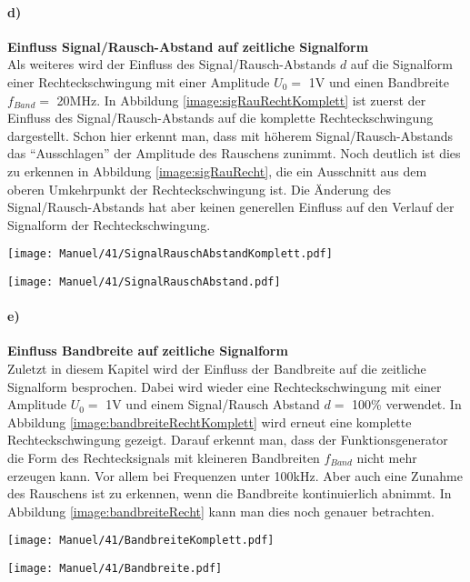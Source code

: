 \paragraph{d)}\textbf{Einfluss Signal/Rausch-Abstand auf zeitliche Signalform}\\
Als weiteres wird der Einfluss des Signal/Rausch-Abstands $d$ auf die Signalform einer Rechteckschwingung mit einer Amplitude $U_0=$ 1V und einen Bandbreite $f_{Band}=$ 20MHz.
In Abbildung \ref{image:sigRauRechtKomplett} ist zuerst der Einfluss des Signal/Rausch-Abstands auf die komplette Rechteckschwingung dargestellt. Schon hier erkennt man, dass mit höherem Signal/Rausch-Abstands das \enquote{Ausschlagen} der Amplitude des Rauschens zunimmt. Noch deutlich ist dies zu erkennen in Abbildung \ref{image:sigRauRecht}, die ein Ausschnitt aus dem oberen Umkehrpunkt der Rechteckschwingung ist. Die Änderung des Signal/Rausch-Abstands hat aber keinen generellen Einfluss auf den Verlauf der Signalform der Rechteckschwingung.
\newpage
\begin{center}
    \texttt{[image: Manuel/41/SignalRauschAbstandKomplett.pdf]}
    \label{image:sigRauRechtKomplett}
\end{center}
\begin{center}
    \texttt{[image: Manuel/41/SignalRauschAbstand.pdf]}
    \label{image:sigRauRecht}
\end{center}

\paragraph{e)}\textbf{Einfluss Bandbreite auf zeitliche Signalform}\\
Zuletzt in diesem Kapitel wird der Einfluss der Bandbreite auf die zeitliche Signalform besprochen. Dabei wird wieder eine Rechteckschwingung mit einer Amplitude $U_0=$ 1V und einem Signal/Rausch Abstand $d=$ 100\% verwendet. In Abbildung \ref{image:bandbreiteRechtKomplett} wird erneut eine komplette Rechteckschwingung gezeigt. Darauf erkennt man, dass der Funktionsgenerator die Form des Rechtecksignals mit kleineren Bandbreiten $f_{Band}$ nicht mehr erzeugen kann. Vor allem bei Frequenzen unter 100kHz. Aber auch eine Zunahme des Rauschens ist zu erkennen, wenn die Bandbreite kontinuierlich abnimmt. In Abbildung \ref{image:bandbreiteRecht} kann man dies noch genauer betrachten. 
\newpage
\begin{center}
    \texttt{[image: Manuel/41/BandbreiteKomplett.pdf]}
    \label{image:bandbreiteRechtKomplett}
\end{center}
\begin{center}
    \texttt{[image: Manuel/41/Bandbreite.pdf]}
    \label{image:bandbreiteRecht}
\end{center}